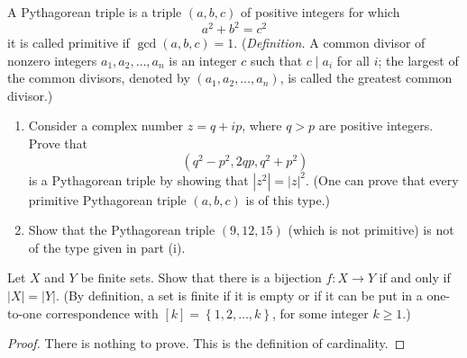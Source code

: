 \begin{questions}
\question
     A Pythagorean triple is a triple \((a, b, c)\) of positive integers for which
\[
a^2+b^2=c^2
\]
it is called primitive if  \(\operatorname{gcd}(a, b, c)=1\). (\textit{Definition.} A common divisor of nonzero integers \(a_1, a_2, \ldots, a_n\) is an integer \(c\) such that \(c \mid a_i\) for all \(i\); the largest of the common divisors, denoted by \(\left(a_1, a_2, \ldots, a_n\right)\), is called the greatest common divisor.)
\begin{enumerate}[label=(\alph*)]
    \item Consider a complex number \(z=q+i p\), where \(q>p\) are positive integers. Prove that
\[
\left(q^2-p^2, 2 q p, q^2+p^2\right)
\]
is a Pythagorean triple by showing that \(\left|z^2\right|=|z|^2\). (One can prove that every primitive Pythagorean triple \((a, b, c)\) is of this type.)
\item Show that the Pythagorean triple \((9,12,15)\) (which is not primitive) is not of the type given in part (i).

\end{enumerate}


\begin{solution}
    
\end{solution}


\question
    Let \(X\) and \(Y\) be finite sets. Show that there is a bijection \(f\colon X \rightarrow Y\) if and only if \(|X|=|Y|\). (By definition, a set is finite if it is empty or if it can be put in a one-to-one correspondence with \([k] = \left\{ 1,2,\ldots, k \right\}\), for some integer \(k\geq 1\).)

\begin{proof} There is nothing to prove. This is the definition of cardinality. 
\end{proof}



\end{questions}
